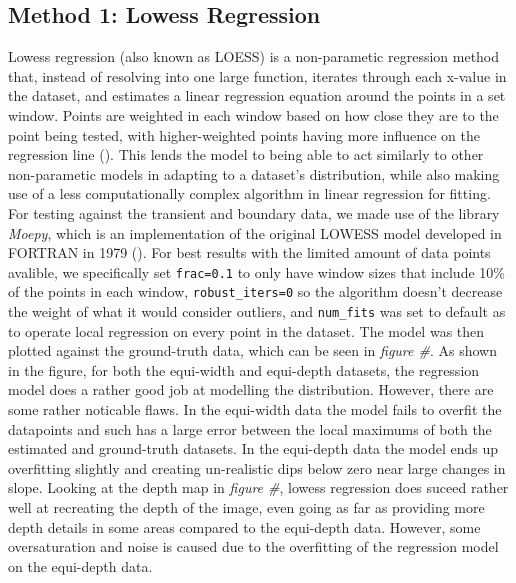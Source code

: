 \documentclass[letterpaper,12pt]{article}
\begin{document}
\subsection{Method 1: Lowess Regression}
Lowess regression (also known as LOESS) is a non-parametic regression method that, instead 
of resolving into one large function, iterates through each x-value in the dataset, and 
estimates a linear regression equation around the points in a set window. Points are 
weighted in each window based on how close they are to the point being tested, with 
higher-weighted points having more influence on the regression line (\cite{Figueira_2021}). 
This lends the model to being able to act similarly to other non-parametic models in adapting
to a dataset's distribution, while also making use of a less computationally complex algorithm
in linear regression for fitting. For testing against the transient and boundary data, we
made use of the library \emph{Moepy}, which is an implementation of the original LOWESS model 
developed in FORTRAN in 1979 (\cite{ayrton_bourn_2021_4812979}). For best results with the
limited amount of data points avalible, we specifically set \verb|frac=0.1| to only have window
sizes that include 10\% of the points in each window, \verb|robust_iters=0| so the algorithm
doesn't decrease the weight of what it would consider outliers, and \verb|num_fits| was set
to default as to operate local regression on every point in the dataset. The model was
then plotted against the ground-truth data, which can be seen in \emph{figure \#}. As shown
in the figure, for both the equi-width and equi-depth datasets, the regression model does
a rather good job at modelling the distribution. However, there are some rather noticable flaws.
In the equi-width data the model fails to overfit the datapoints and such has a large error
between the local maximums of both the estimated and ground-truth datasets. In the equi-depth
data the model ends up overfitting slightly and creating un-realistic dips below zero near large
changes in slope. Looking at the depth map in \emph{figure \#}, lowess regression does suceed
rather well at recreating the depth of the image, even going as far as providing more depth details
in some areas compared to the equi-depth data. However, some oversaturation and noise is caused
due to the overfitting of the regression model on the equi-depth data.
\end{document}

